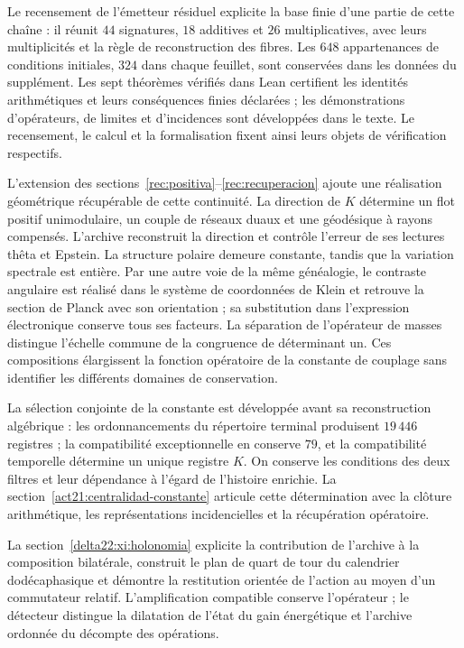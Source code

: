 Le recensement de l'émetteur résiduel explicite la base finie d'une partie de cette chaîne : il réunit \(44\) signatures, \(18\) additives et \(26\) multiplicatives, avec leurs multiplicités et la règle de reconstruction des fibres. Les \(648\) appartenances de conditions initiales, \(324\) dans chaque feuillet, sont conservées dans les données du supplément. Les sept théorèmes vérifiés dans Lean certifient les identités arithmétiques et leurs conséquences finies déclarées ; les démonstrations d'opérateurs, de limites et d'incidences sont développées dans le texte. Le recensement, le calcul et la formalisation fixent ainsi leurs objets de vérification respectifs.


L’extension des sections~\ref{rec:positiva}--\ref{rec:recuperacion} ajoute une réalisation géométrique récupérable de cette continuité. La direction de \(K\) détermine un flot positif unimodulaire, un couple de réseaux duaux et une géodésique à rayons compensés. L’archive reconstruit la direction et contrôle l’erreur de ses lectures thêta et Epstein. La structure polaire demeure constante, tandis que la variation spectrale est entière. Par une autre voie de la même généalogie, le contraste angulaire est réalisé dans le système de coordonnées de Klein et retrouve la section de Planck avec son orientation ; sa substitution dans l’expression électronique conserve tous ses facteurs. La séparation de l’opérateur de masses distingue l’échelle commune de la congruence de déterminant un. Ces compositions élargissent la fonction opératoire de la constante de couplage sans identifier les différents domaines de conservation.

\newpage %
La sélection conjointe de la constante est développée avant sa
reconstruction algébrique : les ordonnancements du répertoire terminal produisent
\(19\,446\) registres ; la compatibilité exceptionnelle en conserve \(79\), et la
compatibilité temporelle détermine un unique registre \(K\). On conserve les
conditions des deux filtres et leur dépendance à l’égard de l’histoire enrichie.
La section~\ref{act21:centralidad-constante} articule cette détermination avec
la clôture arithmétique, les représentations incidencielles et la récupération
opératoire.

\par
La section~\ref{delta22:xi:holonomia} explicite la contribution de l'archive à la composition bilatérale, construit le plan de quart de tour du calendrier dodécaphasique et démontre la restitution orientée de l'action au moyen d'un commutateur relatif. L'amplification compatible conserve l'opérateur ; le détecteur distingue la dilatation de l'état du gain énergétique et l'archive ordonnée du décompte des opérations.

